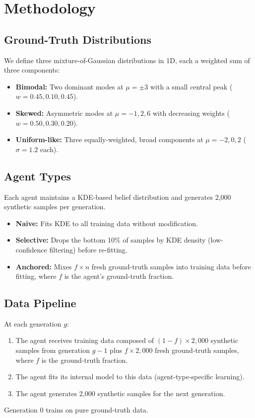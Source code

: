 \documentclass[11pt]{article}
\begin{document}
\section{Methodology}

\subsection{Ground-Truth Distributions}

We define three mixture-of-Gaussian distributions in 1D, each a weighted sum of three components:

\begin{itemize}
  \item \textbf{Bimodal:} Two dominant modes at $\mu = \pm 3$ with a small central peak ($w = 0.45, 0.10, 0.45$).
  \item \textbf{Skewed:} Asymmetric modes at $\mu = -1, 2, 6$ with decreasing weights ($w = 0.50, 0.30, 0.20$).
  \item \textbf{Uniform-like:} Three equally-weighted, broad components at $\mu = -2, 0, 2$ ($\sigma = 1.2$ each).
\end{itemize}

\subsection{Agent Types}

Each agent maintains a KDE-based belief distribution and generates 2{,}000 synthetic samples per generation.

\begin{itemize}
  \item \textbf{Naive:} Fits KDE to all training data without modification.
  \item \textbf{Selective:} Drops the bottom 10\% of samples by KDE density (low-confidence filtering) before re-fitting.
  \item \textbf{Anchored:} Mixes $f \times n$ fresh ground-truth samples into training data before fitting, where $f$ is the agent's ground-truth fraction.
\end{itemize}

\subsection{Data Pipeline}

At each generation $g$:
\begin{enumerate}
  \item The agent receives training data composed of $(1-f) \times 2{,}000$ synthetic samples from generation $g-1$ plus $f \times 2{,}000$ fresh ground-truth samples, where $f$ is the ground-truth fraction.
  \item The agent fits its internal model to this data (agent-type-specific learning).
  \item The agent generates 2{,}000 synthetic samples for the next generation.
\end{enumerate}
Generation 0 trains on pure ground-truth data.
\end{document}
